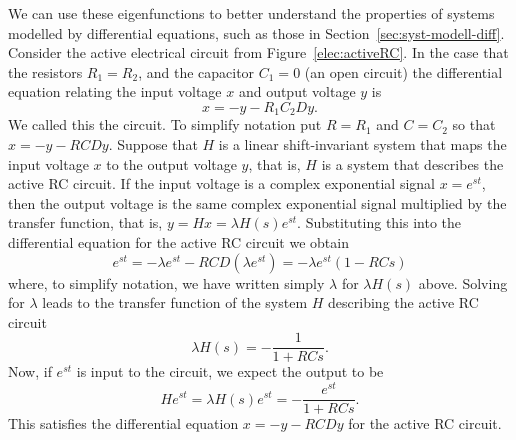 We can use these eigenfunctions to better understand the properties of systems modelled by differential equations, such as those in Section~\ref{sec:syst-modell-diff}.  Consider the active electrical circuit from Figure~\ref{elec:activeRC}.  In the case that the resistors $R_1 = R_2$, and the capacitor $C_1 = 0$ (an open circuit) the differential equation relating the input voltage $x$ and output voltage $y$ is
\[
x = - y - R_1 C_2 Dy.
\]
We called this the  circuit.  To simplify notation put $R = R_1$ and $C = C_2$ so that $x = -y - RCD y$.   
Suppose that $H$ is a linear shift-invariant system that maps the input voltage $x$ to the output voltage $y$, that is, $H$ is a system that describes the active RC circuit.  If the input voltage is a complex exponential signal $x = e^{st}$, then the output voltage is the same complex exponential signal multiplied by the transfer function, that is, $y = Hx = \lambda H(s) e^{st}$.  Substituting this into the differential equation for the active RC circuit we obtain
\[
e^{st} = - \lambda e^{st}- R C D (\lambda e^{st}) = -\lambda e^{st} (1  - R C s)
\]
where, to simplify notation, we have written simply $\lambda$ for $\lambda H(s)$ above.  Solving for $\lambda$ leads to the transfer function of the system $H$ describing the active RC circuit
\begin{equation}\label{eq:transferRCH}
\lambda H(s) = -\frac{1}{1 + R C s}.
\end{equation}
Now, if $e^{st}$ is input to the circuit, we expect the output to be
\[
H e^{st} = \lambda H(s) e^{st} = -\frac{e^{st}}{1 + R C s}.
\]
This satisfies the differential equation $x = -y - RCDy$ for the active RC circuit.

